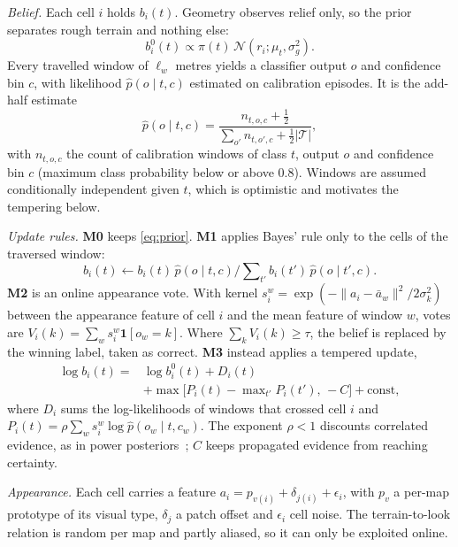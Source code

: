 \documentclass[conference,a4paper]{IEEEtran}
\begin{document}
\emph{Belief.} Each cell $i$ holds $b_i(t)$. Geometry observes relief only, so the prior separates rough terrain and nothing else:
\begin{equation}
b_i^0(t)\propto \pi(t)\,\mathcal{N}(r_i;\mu_t,\sigma_g^2).
\label{eq:prior}
\end{equation}
Every travelled window of $\ell_w$ metres yields a classifier output $o$ and confidence bin $c$, with likelihood $\hat p(o\mid t,c)$ estimated on calibration episodes. It is the add-half estimate
\begin{equation}
\hat p(o\mid t,c)=\frac{n_{t,o,c}+\tfrac12}{\sum_{o'}n_{t,o',c}+\tfrac12|\mathcal{T}|},
\label{eq:confusion}
\end{equation}
with $n_{t,o,c}$ the count of calibration windows of class $t$, output $o$ and confidence bin $c$ (maximum class probability below or above 0.8). Windows are assumed conditionally independent given $t$, which is optimistic and motivates the tempering below.

\emph{Update rules.} \textbf{M0} keeps \eqref{eq:prior}. \textbf{M1} applies Bayes' rule only to the cells of the traversed window:
\begin{equation}
b_i(t)\leftarrow b_i(t)\,\hat p(o\mid t,c)\Big/\sum\nolimits_{t'} b_i(t')\,\hat p(o\mid t',c).
\label{eq:bayes}
\end{equation}
\textbf{M2} is an online appearance vote. With kernel $s_i^w=\exp(-\lVert a_i-\bar a_w\rVert^2/2\sigma_k^2)$ between the appearance feature of cell $i$ and the mean feature of window $w$, votes are $V_i(k)=\sum_w s_i^w\mathbf{1}[o_w=k]$. Where $\sum_k V_i(k)\geq\tau$, the belief is replaced by the winning label, taken as correct. \textbf{M3} instead applies a tempered update,
\begin{equation}
\begin{aligned}
\log b_i(t)={}&\log b_i^0(t)+D_i(t)\\
&+\max\bigl[P_i(t)-\max\nolimits_{t'}P_i(t'),\,-C\bigr]+\text{const},
\end{aligned}
\label{eq:m3}
\end{equation}
where $D_i$ sums the log-likelihoods of windows that crossed cell $i$ and $P_i(t)=\rho\sum_w s_i^w\log\hat p(o_w\mid t,c_w)$. The exponent $\rho<1$ discounts correlated evidence, as in power posteriors~\cite{bissiri2016}; $C$ keeps propagated evidence from reaching certainty.

\emph{Appearance.} Each cell carries a feature $a_i=p_{v(i)}+\delta_{j(i)}+\epsilon_i$, with $p_v$ a per-map prototype of its visual type, $\delta_j$ a patch offset and $\epsilon_i$ cell noise. The terrain-to-look relation is random per map and partly aliased, so it can only be exploited online.
\end{document}
